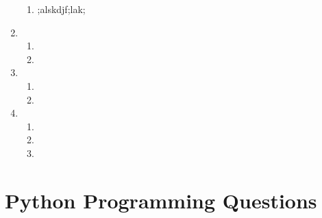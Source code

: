 \documentclass[12pt]{article}
\begin{document}
\begin{enumerate}
\begin{enumerate}
\item ;alskdjf;lak;
\end{enumerate}

\item
  \begin{enumerate}
  \item
  \item
  \end{enumerate}

\item
  \begin{enumerate}
  \item
  \item
  \end{enumerate}
 \item
 \begin{enumerate}
     \item 
     \item 
     \item
 \end{enumerate}
\end{enumerate}

\section{Python Programming Questions}

\end{document}
